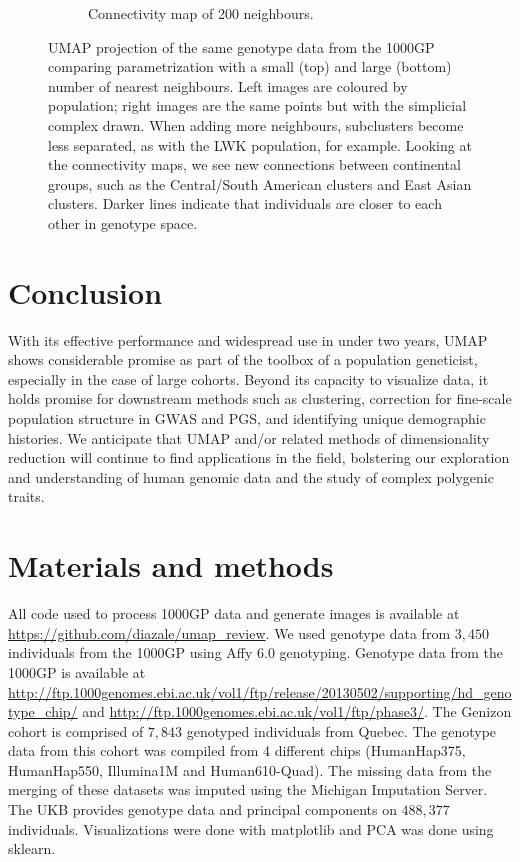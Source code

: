 \begin{figure}[h!]
\begin{subfigure}[b]{0.4\linewidth}
    \caption{Connectivity map of 200 neighbours.}
    \label{fig:UMAP_high_NN_connectivity}
  \end{subfigure}
  \caption[UMAP parametrization impacts cluster connectivity]{UMAP projection of the same genotype data from the 1000GP comparing parametrization with a small (top) and large (bottom) number of nearest neighbours. Left images are coloured by population; right images are the same points but with the simplicial complex drawn. When adding more neighbours, subclusters become less separated, as with the LWK population, for example. Looking at the connectivity maps, we see new connections between continental groups, such as the Central/South American clusters and East Asian clusters. Darker lines indicate that individuals are closer to each other in genotype space.}
  \label{fig:UMAP_connectivity}
\end{figure}

\clearpage

\section{Conclusion}
With its effective performance and widespread use in under two years, UMAP shows considerable promise as part of the toolbox of a population geneticist, especially in the case of large cohorts. Beyond its capacity to visualize data, it holds promise for downstream methods such as clustering, correction for fine-scale population structure in GWAS and PGS, and identifying unique demographic histories. We anticipate that UMAP and/or related methods of dimensionality reduction will continue to find applications in the field, bolstering our exploration and understanding of human genomic data and the study of complex polygenic traits.

\section{Materials and methods}
All code used to process 1000GP data and generate images is available at \url{https://github.com/diazale/umap_review}. We used genotype data from $3,450$ individuals from the 1000GP using Affy 6.0 genotyping\citep{10002015global}. Genotype data from the 1000GP is available at \url{http://ftp.1000genomes.ebi.ac.uk/vol1/ftp/release/20130502/supporting/hd_genotype_chip/} and \url{http://ftp.1000genomes.ebi.ac.uk/vol1/ftp/phase3/}. The Genizon cohort is comprised of $7,843$ genotyped individuals from Quebec. The genotype data from this cohort was compiled from 4 different chips (HumanHap375, HumanHap550, Illumina1M and Human610-Quad). The missing data from the merging of these datasets was imputed using the Michigan Imputation Server.  The UKB provides genotype data and principal components on $488,377$ individuals. Visualizations were done with matplotlib\citep{Hunter2007} and PCA was done using sklearn\citep{scikit-learn}. 

